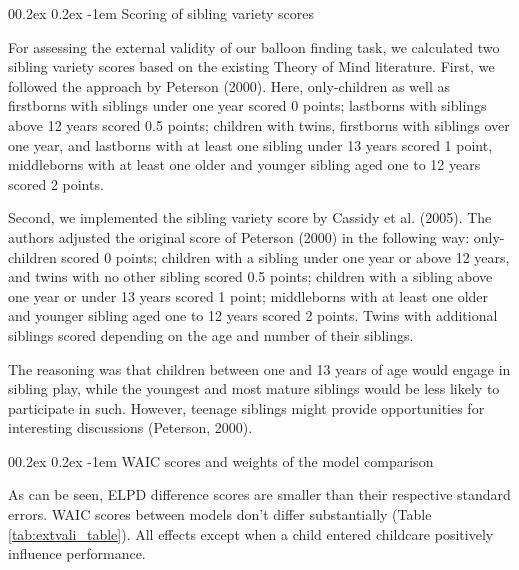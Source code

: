 \documentclass[
  man,floatsintext]{apa6}
\makeatletter
\let\oldparagraph\paragraph
\renewcommand{\paragraph}[1]{\oldparagraph{#1}\mbox{}}
\renewcommand{\paragraph}{\@startsection{paragraph}{4}{\parindent}%
  {0\baselineskip \@plus 0.2ex \@minus 0.2ex}%
  {-1em}%
  {\normalfont\normalsize\bfseries\itshape\typesectitle}}
\makeatother
\begin{document}
\hypertarget{scoring-of-sibling-variety-scores}{%
\paragraph{Scoring of sibling variety scores}\label{scoring-of-sibling-variety-scores}}

For assessing the external validity of our balloon finding task, we calculated two sibling variety scores based on the existing Theory of Mind literature.
First, we followed the approach by Peterson (2000). Here, only-children as well as firstborns with siblings under one year scored 0 points; lastborns with siblings above 12 years scored 0.5 points; children with twins, firstborns with siblings over one year, and lastborns with at least one sibling under 13 years scored 1 point, middleborns with at least one older and younger sibling aged one to 12 years scored 2 points.

Second, we implemented the sibling variety score by Cassidy et al. (2005). The authors adjusted the original score of Peterson (2000) in the following way: only-children scored 0 points; children with a sibling under one year or above 12 years, and twins with no other sibling scored 0.5 points; children with a sibling above one year or under 13 years scored 1 point; middleborns with at least one older and younger sibling aged one to 12 years scored 2 points. Twins with additional siblings scored depending on the age and number of their siblings.

The reasoning was that children between one and 13 years of age would engage in sibling play, while the youngest and most mature siblings would be less likely to participate in such. However, teenage siblings might provide opportunities for interesting discussions (Peterson, 2000).

\hypertarget{waic-scores-and-weights-of-the-model-comparison}{%
\paragraph{WAIC scores and weights of the model comparison}\label{waic-scores-and-weights-of-the-model-comparison}}

As can be seen, ELPD difference scores are smaller than their respective standard errors. WAIC scores between models don't differ substantially (Table \ref{tab:extvali_table}). All effects except when a child entered childcare positively influence performance.
\end{document}
